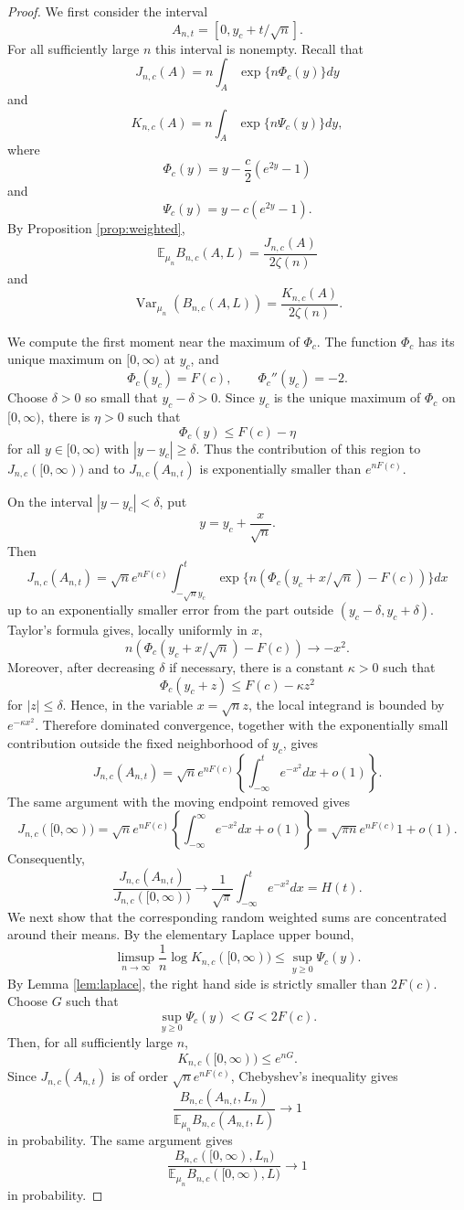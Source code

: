 \documentclass[10pt,a4paper]{amsart}
\newcommand{\Var}{\operatorname{Var}}
\newcommand{\ex}{\mathbb E}
\begin{document}
\begin{proof}
We first consider the interval
$$
A_{n,t}=[0,y_c+t/\sqrt{n}].
$$
For all sufficiently large $n$ this interval is nonempty. Recall that
$$
J_{n,c}(A)=
n\int_A \exp\{n\Phi_c(y)\}dy
$$
and
$$
K_{n,c}(A)=
n\int_A \exp\{n\Psi_c(y)\}dy,
$$
where
$$
\Phi_c(y)=y-\frac{c}{2}(e^{2y}-1)
$$
and
$$
\Psi_c(y)=y-c(e^{2y}-1).
$$
By Proposition \ref{prop:weighted},
$$
\ex_{\mu_n}B_{n,c}(A,L)=\frac{J_{n,c}(A)}{2\zeta(n)}
$$
and
$$
\Var_{\mu_n}(B_{n,c}(A,L))
=
\frac{K_{n,c}(A)}{2\zeta(n)}.
$$

We compute the first moment near the maximum of $\Phi_c$.
The function $\Phi_c$ has its unique maximum on $[0,\infty)$ at $y_c$,
and
$$
\Phi_c(y_c)=F(c),\qquad \Phi_c''(y_c)=-2.
$$
Choose $\delta>0$ so small that $y_c-\delta>0$.
Since $y_c$ is the unique maximum of $\Phi_c$ on $[0,\infty)$, there is
$\eta>0$ such that
$$
\Phi_c(y)\le F(c)-\eta
$$
for all $y\in[0,\infty)$ with $|y-y_c|\ge\delta$.
Thus the contribution of this region to $J_{n,c}([0,\infty))$ and to
$J_{n,c}(A_{n,t})$ is exponentially smaller than $e^{nF(c)}$.

On the interval $|y-y_c|<\delta$, put
$$
y=y_c+\frac{x}{\sqrt{n}}.
$$
Then
$$
J_{n,c}(A_{n,t})
=
\sqrt{n}e^{nF(c)}
\int_{-\sqrt{n}y_c}^{t}
\exp\{n(\Phi_c(y_c+x/\sqrt{n})-F(c))\}dx
$$
up to an exponentially smaller error from the part outside
$(y_c-\delta,y_c+\delta)$.
Taylor's formula gives, locally uniformly in $x$,
$$
n(\Phi_c(y_c+x/\sqrt{n})-F(c))\longrightarrow -x^2 .
$$
Moreover, after decreasing $\delta$ if necessary, there is a constant
$\kappa>0$ such that
$$
\Phi_c(y_c+z)\le F(c)-\kappa z^2
$$
for $|z|\le\delta$.
Hence, in the variable $x=\sqrt n z$, the local integrand is bounded by
$e^{-\kappa x^2}$.
Therefore dominated convergence, together with the exponentially small
contribution outside the fixed neighborhood of $y_c$, gives
$$
J_{n,c}(A_{n,t})
=
\sqrt{n}e^{nF(c)}
\left\{
\int_{-\infty}^{t}e^{-x^2}dx+o(1)
\right\}.
$$
The same argument with the moving endpoint removed gives
$$
J_{n,c}([0,\infty))
=
\sqrt{n}e^{nF(c)}
\left\{
\int_{-\infty}^{\infty}e^{-x^2}dx+o(1)
\right\}
=
\sqrt{\pi n}e^{nF(c)}{1+o(1)}.
$$
Consequently,
$$
\frac{J_{n,c}(A_{n,t})}{J_{n,c}([0,\infty))}
\longrightarrow
\frac{1}{\sqrt{\pi}}\int_{-\infty}^{t}e^{-x^2}dx
=H(t).
$$
%
We next show that the corresponding random weighted sums are concentrated
around their means. By the elementary Laplace upper bound,
$$
\limsup_{n\to\infty}
\frac{1}{n}\log K_{n,c}([0,\infty))
\le
\sup_{y\ge0}\Psi_c(y).
$$
By Lemma \ref{lem:laplace}, the right hand side is strictly smaller than
$2F(c)$. Choose $G$ such that
$$
\sup_{y\ge0}\Psi_c(y)<G<2F(c).
$$
Then, for all sufficiently large $n$,
$$
K_{n,c}([0,\infty))\le e^{nG}.
$$
Since $J_{n,c}(A_{n,t})$ is of order $\sqrt n e^{nF(c)}$, Chebyshev's
inequality gives
$$
\frac{
B_{n,c}(A_{n,t},L_n)
}{
\ex_{\mu_n}B_{n,c}(A_{n,t},L)
}
\longrightarrow 1
$$
in probability. The same argument gives
$$
\frac{
B_{n,c}([0,\infty),L_n)
}{
\ex_{\mu_n}B_{n,c}([0,\infty),L)
}
\longrightarrow 1
$$
in probability.


\end{proof}
\end{document}
